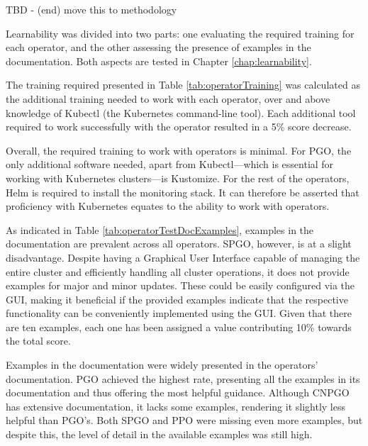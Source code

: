 TBD - (end) move this to methodology

Learnability was divided into two parts: one evaluating the required training for each operator, and the other assessing the presence of examples in the documentation.
Both aspects are tested in Chapter \ref{chap:learnability}.

The training required presented in Table \ref{tab:operatorTraining} was calculated as the additional training needed to work with each operator, over and above knowledge of Kubectl (the Kubernetes command-line tool).
Each additional tool required to work successfully with the operator resulted in a 5\% score decrease.

Overall, the required training to work with operators is minimal. For PGO, the only additional software needed, apart from Kubectl—which is essential for working with Kubernetes clusters—is Kustomize.
For the rest of the operators, Helm is required to install the monitoring stack. It can therefore be asserted that proficiency with Kubernetes equates to the ability to work with operators.


As indicated in Table \ref{tab:operatorTestDocExamples}, examples in the documentation are prevalent across all operators. SPGO, however, is at a slight disadvantage.
Despite having a Graphical User Interface capable of managing the entire cluster and efficiently handling all cluster operations, it does not provide examples for major and minor updates.
These could be easily configured via the GUI, making it beneficial if the provided examples indicate that the respective functionality can be conveniently implemented using the GUI.
Given that there are ten examples, each one has been assigned a value contributing 10\% towards the total score.

Examples in the documentation were widely presented in the operators' documentation.
PGO achieved the highest rate, presenting all the examples in its documentation and thus offering the most helpful guidance.
Although CNPGO has extensive documentation, it lacks some examples, rendering it slightly less helpful than PGO's.
Both SPGO and PPO were missing even more examples, but despite this, the level of detail in the available examples was still high.

